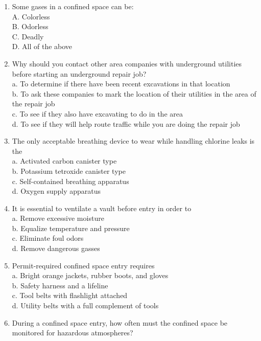 \documentclass{article}
\begin{document}
\begin{enumerate}
\item Some gases in a confined space can be:\\
A.	Colorless\\
B.	Odorless\\
C.	Deadly\\
D.	All of the above

\item Why should you contact other area companies with underground utilities before starting an underground repair job?\\
a.	 To determine if there have been recent excavations in that location\\
b.	 To ask these companies to mark the location of their utilities in the area of the repair job\\
c.	 To see if they also have excavating to do in the area\\
d.	 To see if they will help route traffic while you are doing the repair job\\
\item The only acceptable breathing device to wear while handling chlorine leaks is the\\
a. Activated carbon canister type\\
b. Potassium tetroxide canister type\\
c. Self-contained breathing apparatus\\
d.	Oxygen supply apparatus\\
\item It is essential to ventilate a vault before entry in order to\\
a. Remove excessive moisture\\
b. Equalize temperature and pressure\\
c. Eliminate foul odors\\
d.	 Remove dangerous gasses\\
\item Permit-required confined space entry requires\\
a. Bright orange jackets, rubber boots, and gloves\\
b. Safety harness and a lifeline\\
c. Tool belts with flashlight attached\\
d. Utility belts with a full complement of tools\\
\item During a confined space entry, how often must the confined space be monitored for hazardous atmospheres?\\

\end{enumerate}
\end{document}
